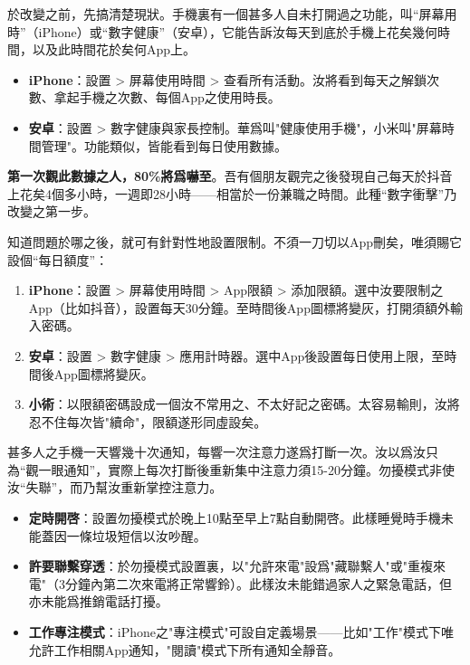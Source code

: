 


於改變之前，先搞清楚現狀。手機裏有一個甚多人自未打開過之功能，叫“屏幕用時”（iPhone）或“數字健康”（安卓），它能告訴汝每天到底於手機上花矣幾何時間，以及此時間花於矣何App上。

\begin{itemize}
  \item \textbf{iPhone}：設置 > 屏幕使用時間 > 查看所有活動。汝將看到每天之解鎖次數、拿起手機之次數、每個App之使用時長。
  \item \textbf{安卓}：設置 > 數字健康與家長控制。華爲叫"健康使用手機"，小米叫"屏幕時間管理"。功能類似，皆能看到每日使用數據。
\end{itemize}

\textbf{第一次觀此數據之人，80\%將爲嚇至}。吾有個朋友觀完之後發現自己每天於抖音上花矣4個多小時，一週即28小時——相當於一份兼職之時間。此種“數字衝擊”乃改變之第一步。


知道問題於哪之後，就可有針對性地設置限制。不須一刀切以App刪矣，唯須賜它設個“每日額度”：

\begin{enumerate}
  \item \textbf{iPhone}：設置 > 屏幕使用時間 > App限額 > 添加限額。選中汝要限制之App（比如抖音），設置每天30分鐘。至時間後App圖標將變灰，打開須額外輸入密碼。
  \item \textbf{安卓}：設置 > 數字健康 > 應用計時器。選中App後設置每日使用上限，至時間後App圖標將變灰。
  \item \textbf{小術}：以限額密碼設成一個汝不常用之、不太好記之密碼。太容易輸則，汝將忍不住每次皆"續命"，限額遂形同虛設矣。
\end{enumerate}


甚多人之手機一天響幾十次通知，每響一次注意力遂爲打斷一次。汝以爲汝只為“觀一眼通知”，實際上每次打斷後重新集中注意力須15-20分鐘。勿擾模式非使汝“失聯”，而乃幫汝重新掌控注意力。

\begin{itemize}
  \item \textbf{定時開啓}：設置勿擾模式於晚上10點至早上7點自動開啓。此樣睡覺時手機未能蓋因一條垃圾短信以汝吵醒。
  \item \textbf{許要聯繫穿透}：於勿擾模式設置裏，以"允許來電"設爲"藏聯繫人"或"重複來電"（3分鐘內第二次來電將正常響鈴）。此樣汝未能錯過家人之緊急電話，但亦未能爲推銷電話打擾。
  \item \textbf{工作專注模式}：iPhone之"專注模式"可設自定義場景——比如"工作"模式下唯允許工作相關App通知，"閱讀"模式下所有通知全靜音。
\end{itemize}

